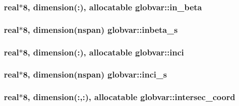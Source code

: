 \subsubsection[{in\+\_\+beta}]{\setlength{\rightskip}{0pt plus 5cm}real$\ast$8, dimension(\+:), allocatable globvar\+::in\+\_\+beta}\label{namespaceglobvar_a3b0ba34304a646f87d0ee37d4b8d8618}
\hypertarget{namespaceglobvar_ac564ea1048d771da8ef902ab237e6cd4}{}
\subsubsection[{inbeta\+\_\+s}]{\setlength{\rightskip}{0pt plus 5cm}real$\ast$8, dimension({\bf nspan}) globvar\+::inbeta\+\_\+s}\label{namespaceglobvar_ac564ea1048d771da8ef902ab237e6cd4}
\hypertarget{namespaceglobvar_aa012253fe6b7a8b294e3e65bad3c31e8}{}
\subsubsection[{inci}]{\setlength{\rightskip}{0pt plus 5cm}real$\ast$8, dimension(\+:), allocatable globvar\+::inci}\label{namespaceglobvar_aa012253fe6b7a8b294e3e65bad3c31e8}
\hypertarget{namespaceglobvar_abe8aad5ab0f38bb4ec7e960415ced26a}{}
\subsubsection[{inci\+\_\+s}]{\setlength{\rightskip}{0pt plus 5cm}real$\ast$8, dimension({\bf nspan}) globvar\+::inci\+\_\+s}\label{namespaceglobvar_abe8aad5ab0f38bb4ec7e960415ced26a}
\hypertarget{namespaceglobvar_ad35c726e5eed845b38c59490c65bd02e}{}
\subsubsection[{intersec\+\_\+coord}]{\setlength{\rightskip}{0pt plus 5cm}real$\ast$8, dimension(\+:,\+:), allocatable globvar\+::intersec\+\_\+coord}\label{namespaceglobvar_ad35c726e5eed845b38c59490c65bd02e}
\hypertarget{namespaceglobvar_ac05346905a5106a2caa9e00cbee2e308}{}
